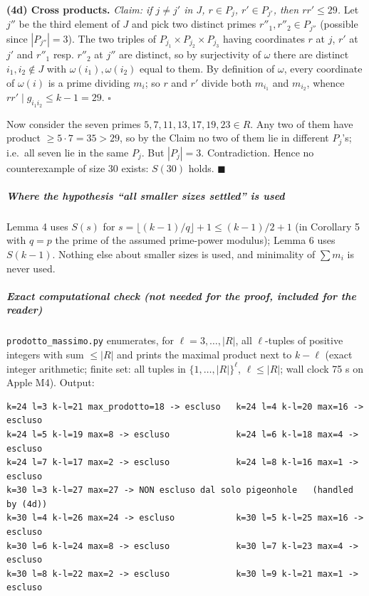\textbf{(4d) Cross products.} \emph{Claim: if \(j\ne j'\) in \(J\),
\(r\in P_j\), \(r'\in P_{j'}\), then \(r r'\le 29\).} Let \(j''\) be the
third element of \(J\) and pick two distinct primes
\(r''_1,r''_2\in P_{j''}\) (possible since \(|P_{j''}|=3\)). The two
triples of \(P_{j_1}\times P_{j_2}\times P_{j_3}\) having coordinates
\(r\) at \(j\), \(r'\) at \(j'\) and \(r''_1\) resp. \(r''_2\) at
\(j''\) are distinct, so by surjectivity of \(\omega\) there are
distinct \(i_1,i_2\notin J\) with \(\omega(i_1),\omega(i_2)\) equal to
them. By definition of \(\omega\), every coordinate of \(\omega(i)\) is
a prime dividing \(m_i\); so \(r\) and \(r'\) divide both \(m_{i_1}\)
and \(m_{i_2}\), whence \(rr'\mid g_{i_1i_2}\le k-1=29\). \(\square\)

Now consider the seven primes \(5,7,11,13,17,19,23\in R\). Any two of
them have product \(\ge5\cdot7=35>29\), so by the Claim no two of them
lie in different \(P_j\)'s; i.e.~all seven lie in the same \(P_j\). But
\(|P_j|=3\). Contradiction. Hence no counterexample of size \(30\)
exists: \(S(30)\) holds. \(\blacksquare\)

\subparagraph{Where the hypothesis ``all smaller sizes settled'' is
used}\label{where-the-hypothesis-all-smaller-sizes-settled-is-used}

Lemma 4 uses \(S(s)\) for \(s=\lfloor (k-1)/q\rfloor+1\le (k-1)/2+1\)
(in Corollary 5 with \(q=p\) the prime of the assumed prime-power
modulus); Lemma 6 uses \(S(k-1)\). Nothing else about smaller sizes is
used, and minimality of \(\sum m_i\) is never used.

\subparagraph{Exact computational check (not needed for the proof,
included for the
reader)}\label{exact-computational-check-not-needed-for-the-proof-included-for-the-reader}

\texttt{prodotto\_massimo.py} enumerates, for \(\ell=3,\dots,|R|\), all
\(\ell\)-tuples of positive integers with sum \(\le|R|\) and prints the
maximal product next to \(k-\ell\) (exact integer arithmetic; finite
set: all tuples in \(\{1,\dots,|R|\}^\ell\), \(\ell\le|R|\); wall clock
75 s on Apple M4). Output:

\begin{verbatim}
k=24 l=3 k-l=21 max_prodotto=18 -> escluso   k=24 l=4 k-l=20 max=16 -> escluso
k=24 l=5 k-l=19 max=8 -> escluso             k=24 l=6 k-l=18 max=4 -> escluso
k=24 l=7 k-l=17 max=2 -> escluso             k=24 l=8 k-l=16 max=1 -> escluso
k=30 l=3 k-l=27 max=27 -> NON escluso dal solo pigeonhole   (handled by (4d))
k=30 l=4 k-l=26 max=24 -> escluso            k=30 l=5 k-l=25 max=16 -> escluso
k=30 l=6 k-l=24 max=8 -> escluso             k=30 l=7 k-l=23 max=4 -> escluso
k=30 l=8 k-l=22 max=2 -> escluso             k=30 l=9 k-l=21 max=1 -> escluso
\end{verbatim}

